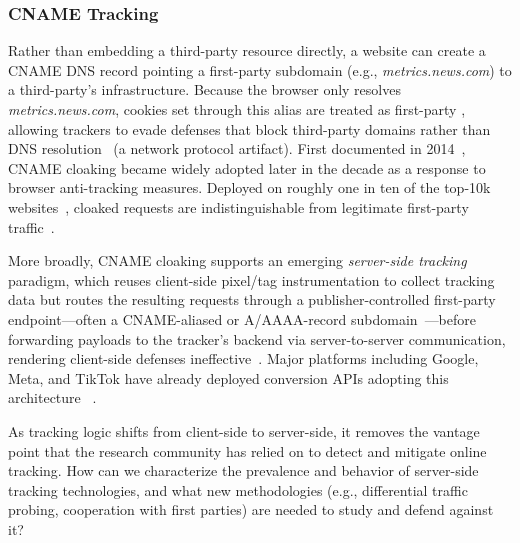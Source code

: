 \subsubsection{CNAME Tracking}
\label{sec:stateful-techniques-cname}
Rather than embedding a third-party resource directly, a website can create a CNAME DNS record pointing a first-party subdomain (e.g., \textit{metrics.news.com}) to a third-party's infrastructure.
%
Because the browser only resolves \textit{metrics.news.com}, cookies set through this alias are treated as first-party \symStorage, allowing trackers to evade defenses that block third-party domains rather than DNS resolution~\cite{dimovaCNAMEGameLargescale2021} (a network protocol artifact). 
%
First documented in 2014~\cite{olejnikSellingPrivacyAuction2014,olejnikBidNotBid2014}, CNAME cloaking became widely adopted later in the decade as a response to browser anti-tracking measures. Deployed on roughly one in ten of the top-10k websites~\cite{dimovaCNAMEGameLargescale2021}, cloaked requests are indistinguishable from legitimate first-party traffic~\cite{dimovaCNAMEGameLargescale2021,chenCookieSwapParty2021}.


More broadly, CNAME cloaking supports an emerging \emph{server-side tracking} paradigm, which reuses client-side pixel/tag instrumentation to collect tracking data but routes the resulting requests through a publisher-controlled first-party endpoint---often a CNAME-aliased or A/AAAA-record subdomain~\cite{jazlanSSTGuardDetectingCharacterizing2026}---before forwarding payloads to the tracker's backend via server-to-server communication, rendering client-side defenses ineffective~\cite{fouadDevilDetailsDetection2024}.
%
Major platforms including Google, Meta, and TikTok have already deployed conversion APIs adopting this architecture
~\cite{fraihiClientsideServersideTracking2024}.

\begin{opbox}
As tracking logic shifts from client-side to server-side, it removes the vantage point that the research community has relied on to detect and mitigate online tracking. How can we characterize the prevalence and behavior of server-side tracking technologies, and what new methodologies (e.g., differential traffic probing, cooperation with first parties) are needed to study and defend against it?
\end{opbox}



